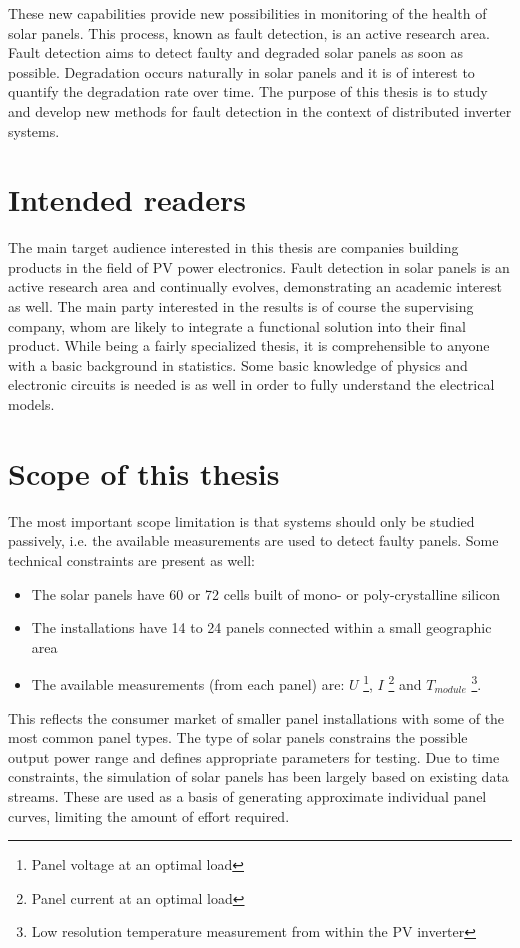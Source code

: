 These new capabilities provide new possibilities in monitoring of the health of solar panels.
This process, known as fault detection, is an active research area.
Fault detection aims to detect faulty and degraded solar panels as soon as possible. 
Degradation occurs naturally in solar panels and it is of interest to quantify the degradation rate over time.
The purpose of this thesis is to study and develop new methods for fault detection in the context of distributed inverter systems.

\section{Intended readers}
The main target audience interested in this thesis are companies building products in the field of PV power electronics.
Fault detection in solar panels is an active research area and continually evolves, demonstrating an academic interest as well.
The main party interested in the results is of course the supervising company, whom are likely to
integrate a functional solution into their final product.
While being a fairly specialized thesis, it is comprehensible to anyone with a basic background in statistics.
Some basic knowledge of physics and electronic circuits is needed is as well in order to fully understand the electrical models.

\clearpage
\section{Scope of this thesis}
The most important scope limitation is that systems should only be studied passively, i.e. the available measurements are used to detect faulty panels.  
Some technical constraints are present as well:
\begin{itemize}
\item The solar panels have 60 or 72 cells built of mono- or poly-crystalline silicon
\item The installations have 14 to 24 panels connected within a small geographic area
\item The available measurements (from each panel) are:
$U$ \footnote{Panel voltage at an optimal load},
$I$ \footnote{Panel current at an optimal load} and
$T_{module}$ \footnote{Low resolution temperature measurement from within the PV inverter}.

\end{itemize}

This reflects the consumer market of smaller panel installations with some of the most common panel types.
The type of solar panels constrains the possible output power range and defines appropriate parameters for testing.
Due to time constraints, the simulation of solar panels has been largely based on existing data streams.
These are used as a basis of generating approximate individual panel curves, limiting the amount of effort required.

